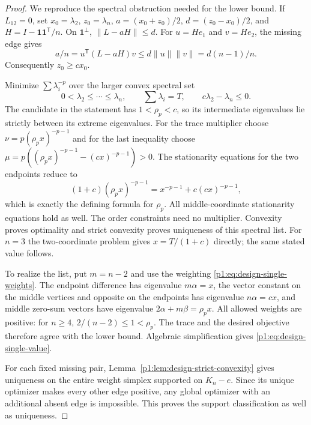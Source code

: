 \documentclass[11pt,a4paper]{article}
\theoremstyle{definition}
\theoremstyle{remark}
\numberwithin{equation}{section}
\begin{document}
\begin{proof}
We reproduce the spectral obstruction needed for the lower bound.
If $L_{12}=0$, set $x_0=\lambda_2$, $z_0=\lambda_n$,
$a=(x_0+z_0)/2$, $d=(z_0-x_0)/2$, and
$H=I-\mathbf1\mathbf1^{\mathsf T}/n$.
On $\mathbf1^\perp$, $\|L-aH\|\le d$.
For $u=He_1$ and $v=He_2$, the missing edge gives
\[
 a/n=u^{\mathsf T}(L-aH)v
 \le d\|u\|\|v\|=d(n-1)/n.
\]
Consequently $z_0\ge c x_0$.

Minimize $\sum\lambda_i^{-p}$ over the larger convex spectral set
\[
 0<\lambda_2\le\cdots\le\lambda_n,\qquad
 \sum\lambda_i=T,\qquad c\lambda_2-\lambda_n\le0.
\]
The candidate in the statement has $1<\rho_p<c$, so its intermediate
eigenvalues lie strictly between its extreme eigenvalues.
For the trace multiplier choose $\nu=p(\rho_p x)^{-p-1}$ and for the
last inequality choose
$\mu=p((\rho_p x)^{-p-1}-(cx)^{-p-1})>0$.
The stationarity equations for the two endpoints reduce to
\[
 (1+c)(\rho_p x)^{-p-1}
  =x^{-p-1}+c(cx)^{-p-1},
\]
which is exactly the defining formula for $\rho_p$.
All middle-coordinate stationarity equations hold as well.
The order constraints need no multiplier.  Convexity proves optimality
and strict convexity proves uniqueness of this spectral list.
For $n=3$ the two-coordinate problem gives $x=T/(1+c)$ directly;
the same stated value follows.

To realize the list, put $m=n-2$ and use the weighting
\eqref{p1:eq:design-single-weights}.  The endpoint difference has
eigenvalue $m\alpha=x$, the vector constant on the middle vertices and
opposite on the endpoints has eigenvalue $n\alpha=cx$, and middle
zero-sum vectors have eigenvalue $2\alpha+m\beta=\rho_p x$.
All allowed weights are positive: for $n\ge4$, $2/(n-2)\le1<\rho_p$.
The trace and the desired objective therefore agree with the lower bound.
Algebraic simplification gives \eqref{p1:eq:design-single-value}.

For each fixed missing pair, Lemma~\ref{p1:lem:design-strict-convexity}
gives uniqueness on the entire weight simplex supported on $K_n-e$.
Since its unique optimizer makes every other edge positive, any global
optimizer with an additional absent edge is impossible.  This proves
the support classification as well as uniqueness.
\end{proof}
\end{document}
